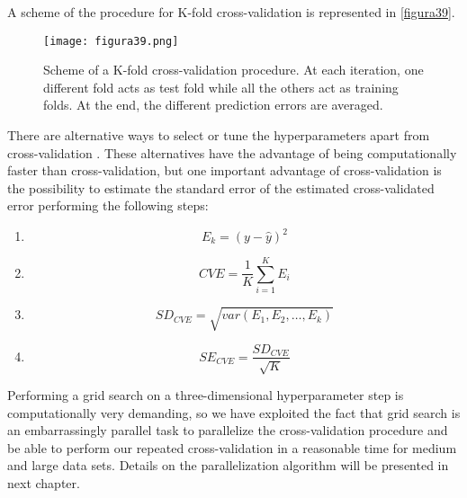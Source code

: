 \vspace{20pt}
A scheme of the procedure for K-fold cross-validation is represented in \autoref{figura39}.

\begin{figure}[hbtp]
\centering
\texttt{[image: figura39.png]}
\caption{Scheme of a K-fold cross-validation procedure. At each iteration, one different fold acts as test fold while all the others act as training folds. At the end, the different prediction errors are averaged.}
\label{figura39}
\end{figure}


There are alternative ways to select or tune the hyperparameters apart from cross-validation \parencite{vujavcic2015computationally, zhang2010regularization}. These alternatives have the advantage of being computationally faster than cross-validation, but one important advantage of cross-validation is the possibility to estimate the standard error of the estimated cross-validated error performing the following steps: 

\vspace{15pt}
\begin{enumerate}
    \item \begin{equation}
    E_k=(y - \hat{y})^2
    \end{equation}
    \item \begin{equation}
    CVE=\frac{1}{K}\sum_{i=1}^{K}E_i
    \end{equation}
    \item \begin{equation}
    SD_{CVE}=\sqrt{var(E_1, E_2, \dots, E_k)}
    \end{equation}
    \item \begin{equation}
    SE_{CVE}=\frac{SD_{CVE}}{\sqrt{K}}
    \end{equation}
\label{secve}
\end{enumerate}

Performing a grid search on a three-dimensional hyperparameter step is computationally very demanding, so we have exploited the fact that grid search is an embarrassingly parallel task \parencite{mcgibbon2016osprey} to parallelize the cross-validation procedure and be able to perform our repeated cross-validation in a reasonable time for medium and large data sets. Details on the parallelization algorithm will be presented in next chapter.
